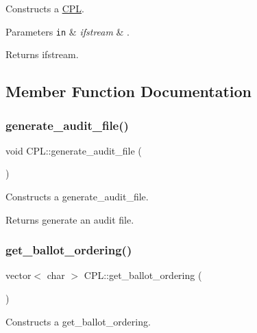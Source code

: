 Constructs a \hyperlink{classCPL}{C\+PL}. 


\begin{DoxyParams}[1]{Parameters}
\mbox{\tt in}  & {\em ifstream} & .\\
\hline
\end{DoxyParams}
\begin{DoxyReturn}{Returns}
ifstream. 
\end{DoxyReturn}


\subsection{Member Function Documentation}
\mbox{\label{classCPL_a12dff0af3da970b81ff2f69159fad58d}} 
\subsubsection{\texorpdfstring{generate\+\_\+audit\+\_\+file()}{generate\_audit\_file()}}
{\footnotesize\ttfamily void C\+P\+L\+::generate\+\_\+audit\+\_\+file (\begin{DoxyParamCaption}{ }\end{DoxyParamCaption})}



Constructs a generate\+\_\+audit\+\_\+file. 

\begin{DoxyReturn}{Returns}
generate an audit file. 
\end{DoxyReturn}
\mbox{\label{classCPL_ab9234cb8c50dfe8696dc38ece07edb26}} 
\subsubsection{\texorpdfstring{get\+\_\+ballot\+\_\+ordering()}{get\_ballot\_ordering()}}
{\footnotesize\ttfamily vector$<$ char $>$ C\+P\+L\+::get\+\_\+ballot\+\_\+ordering (\begin{DoxyParamCaption}{ }\end{DoxyParamCaption})}



Constructs a get\+\_\+ballot\+\_\+ordering. 

